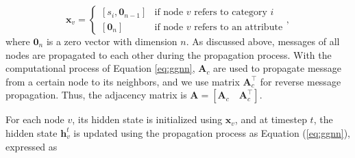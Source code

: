 \documentclass{article}
\begin{document}

\begin{equation}
\mathbf{x}_v=
\begin{cases}
[s_i, \mathbf{0}_{n-1}]& \text{if node $v$ refers to category $i$}\\
[\mathbf{0}_n]& \text{if node $v$ refers to an attribute}
\end{cases},
\end{equation}
where $\mathbf{0}_n$ is a zero vector with dimension $n$. As discussed above, messages of all nodes are propagated to each other during the propagation process. With the computational process of Equation \ref{eq:ggnn}, $\mathbf{A}_c$ are used to propagate message from a certain node to its neighbors, and we use matrix $\mathbf{A}_c^\top$ for reverse message propagation. Thus, the adjacency matrix is $\mathbf{A}=[\mathbf{A}_c \quad \mathbf{A}_c^\top]$.

For each node $v$, its hidden state is initialized using $\mathbf{x}_v$, and at timestep $t$, the hidden state $\mathbf{h}_v^t$ is updated using the propagation process as Equation (\ref{eq:ggnn}),  expressed as
\end{document}
